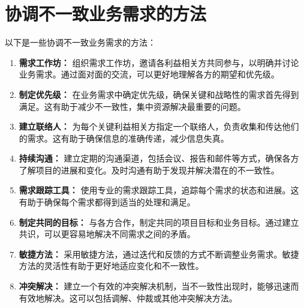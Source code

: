 \documentclass[11pt, a4paper, oneside]{ctexbook}
\begin{document}
\section{协调不一致业务需求的方法}
以下是一些协调不一致业务需求的方法：

\begin{enumerate}
  \item \textbf{需求工作坊：} 组织需求工作坊，邀请各利益相关方共同参与，以明确并讨论业务需求。通过面对面的交流，可以更好地理解各方的期望和优先级。

  \item \textbf{制定优先级：} 在业务需求中确定优先级，确保关键和战略性的需求首先得到满足。这有助于减少不一致性，集中资源解决最重要的问题。

  \item \textbf{建立联络人：} 为每个关键利益相关方指定一个联络人，负责收集和传达他们的需求。这有助于确保信息的准确传递，减少信息失真。

  \item \textbf{持续沟通：} 建立定期的沟通渠道，包括会议、报告和邮件等方式，确保各方了解项目的进展和变化。及时沟通有助于发现并解决潜在的不一致性。

  \item \textbf{需求跟踪工具：} 使用专业的需求跟踪工具，追踪每个需求的状态和进展。这有助于确保每个需求都得到适当的处理和满足。

  \item \textbf{制定共同的目标：} 与各方合作，制定共同的项目目标和业务目标。通过建立共识，可以更容易地解决不同需求之间的矛盾。

  \item \textbf{敏捷方法：} 采用敏捷方法，通过迭代和反馈的方式不断调整业务需求。敏捷方法的灵活性有助于更好地适应变化和不一致性。

  \item \textbf{冲突解决：} 建立一个有效的冲突解决机制，当不一致性出现时，能够迅速而有效地解决。这可以包括调解、仲裁或其他冲突解决方法。

\end{enumerate}
\end{document}
